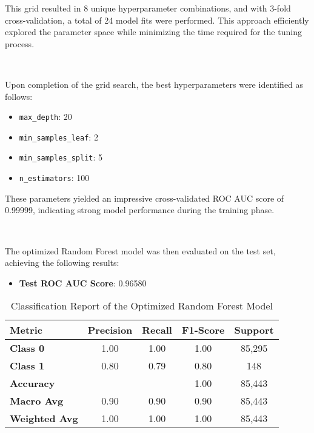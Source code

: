 \documentclass{article}
\begin{document}
\noindent
This grid resulted in 8 unique hyperparameter combinations, and with 3-fold cross-validation, a total of 24 model fits were performed. This approach efficiently explored the parameter space while minimizing the time required for the tuning process.

\

\noindent
Upon completion of the grid search, the best hyperparameters were identified as follows:

\begin{itemize}
    \item \texttt{max\_depth}: 20
    \item \texttt{min\_samples\_leaf}: 2
    \item \texttt{min\_samples\_split}: 5
    \item \texttt{n\_estimators}: 100
\end{itemize}

\noindent
These parameters yielded an impressive cross-validated ROC AUC score of 0.99999, indicating strong model performance during the training phase.

\

\noindent
The optimized Random Forest model was then evaluated on the test set, achieving the following results:

\begin{itemize}
    \item \textbf{Test ROC AUC Score}: 0.96580
\end{itemize}

\begin{table}[h]
\centering
\begin{tabular}{|l|c|c|c|c|}
\hline
\textbf{Metric}        & \textbf{Precision} & \textbf{Recall} & \textbf{F1-Score} & \textbf{Support} \\ \hline
\textbf{Class 0}       & 1.00               & 1.00            & 1.00              & 85,295           \\ \hline
\textbf{Class 1}       & 0.80               & 0.79            & 0.80              & 148              \\ \hline
\textbf{Accuracy}      &                    &                 & 1.00              & 85,443           \\ \hline
\textbf{Macro Avg}     & 0.90               & 0.90            & 0.90              & 85,443           \\ \hline
\textbf{Weighted Avg}  & 1.00               & 1.00            & 1.00              & 85,443           \\ \hline
\end{tabular}
\caption{Classification Report of the Optimized Random Forest Model}
\end{table}
\end{document}

